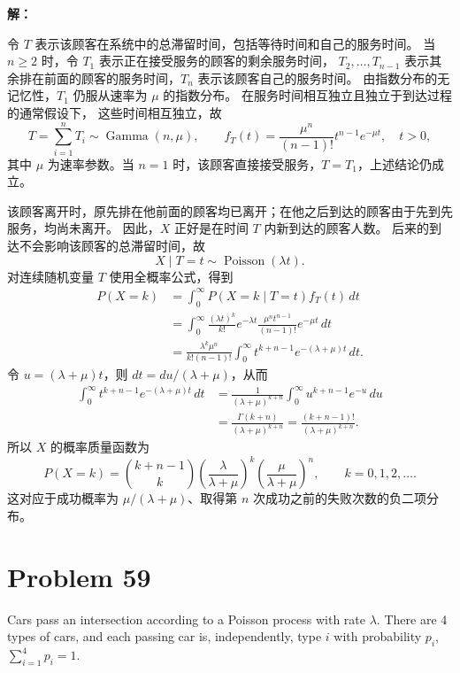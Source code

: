 \documentclass[12pt,a4paper]{article}
\begin{document}
\begin{answerbox}
\textbf{解：}

令 $T$ 表示该顾客在系统中的总滞留时间，包括等待时间和自己的服务时间。
当 $n\ge 2$ 时，令 $T_1$ 表示正在接受服务的顾客的剩余服务时间，
$T_2,\ldots,T_{n-1}$ 表示其余排在前面的顾客的服务时间，$T_n$ 表示该顾客自己的服务时间。
由指数分布的无记忆性，$T_1$ 仍服从速率为 $\mu$ 的指数分布。
在服务时间相互独立且独立于到达过程的通常假设下，
这些时间相互独立，故
$$
T=\sum_{i=1}^{n}T_i\sim\operatorname{Gamma}(n,\mu),
\qquad
f_T(t)=\frac{\mu^n}{(n-1)!}t^{n-1}e^{-\mu t},\quad t>0,
$$
其中 $\mu$ 为速率参数。当 $n=1$ 时，该顾客直接接受服务，$T=T_1$，上述结论仍成立。

该顾客离开时，原先排在他前面的顾客均已离开；在他之后到达的顾客由于先到先服务，均尚未离开。
因此，$X$ 正好是在时间 $T$ 内新到达的顾客人数。
后来的到达不会影响该顾客的总滞留时间，故
$$
X\mid T=t\sim\operatorname{Poisson}(\lambda t).
$$
对连续随机变量 $T$ 使用全概率公式，得到
$$
\begin{aligned}
P(X=k)
&=\int_0^{\infty}P(X=k\mid T=t)f_T(t)\,dt\\
&=\int_0^{\infty}\frac{(\lambda t)^k}{k!}e^{-\lambda t}
\frac{\mu^n t^{n-1}}{(n-1)!}e^{-\mu t}\,dt\\
&=\frac{\lambda^k\mu^n}{k!(n-1)!}
\int_0^{\infty}t^{k+n-1}e^{-(\lambda+\mu)t}\,dt.
\end{aligned}
$$
令 $u=(\lambda+\mu)t$，则 $dt=du/(\lambda+\mu)$，从而
$$
\begin{aligned}
\int_0^{\infty}t^{k+n-1}e^{-(\lambda+\mu)t}\,dt
&=\frac{1}{(\lambda+\mu)^{k+n}}
\int_0^{\infty}u^{k+n-1}e^{-u}\,du\\
&=\frac{\Gamma(k+n)}{(\lambda+\mu)^{k+n}}
=\frac{(k+n-1)!}{(\lambda+\mu)^{k+n}}.
\end{aligned}
$$
所以 $X$ 的概率质量函数为
$$
P(X=k)=\binom{k+n-1}{k}
\left(\frac{\lambda}{\lambda+\mu}\right)^k
\left(\frac{\mu}{\lambda+\mu}\right)^n,
\qquad k=0,1,2,\ldots.
$$
这对应于成功概率为 $\mu/(\lambda+\mu)$、取得第 $n$ 次成功之前的失败次数的负二项分布。
\end{answerbox}

\section{Problem 59}

Cars pass an intersection according to a Poisson process with rate $\lambda$. There are 4 types of cars, and each passing car is, independently, type $i$ with probability $p_i$, $\sum_{i=1}^{4} p_i=1$.
\end{document}
